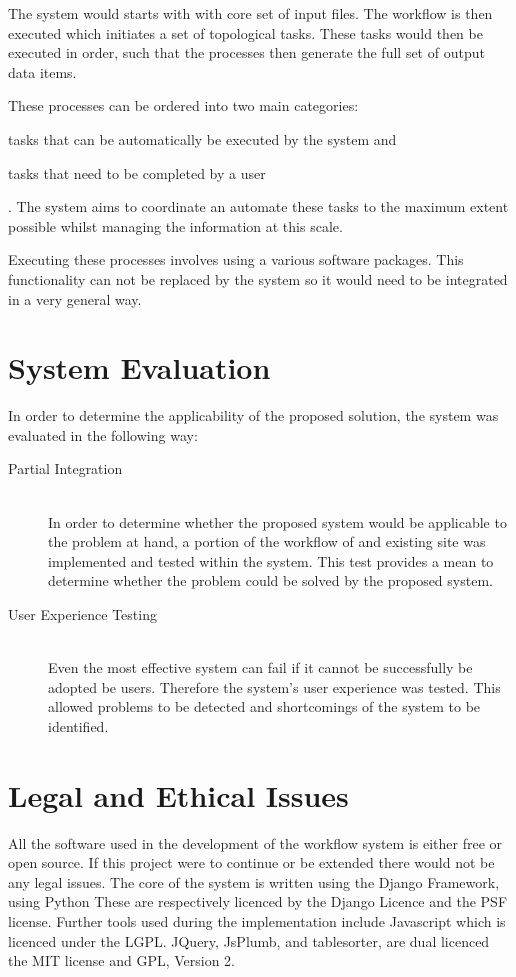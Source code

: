 \documentclass[12pt,a4paper]{report}
\begin{document}
	\noindent The system would starts with with
	core set of input files. The workflow is then executed which initiates a set
	of topological tasks. These tasks would then be executed in order, such that
    the processes then generate the full set of output data items.

    These processes can be ordered into two main categories:
    \begin{inparaenum}[i)]
        \item tasks that can be automatically be executed by the system and
        \item tasks that need to be completed by a user
    \end{inparaenum}. The system aims to coordinate an automate these tasks to
    the maximum extent possible whilst managing the information at this
    scale.

    Executing these processes involves using a various software packages.
    This functionality can not be replaced by the system so it would need
    to be integrated in a very general way.

\section{System Evaluation}
    In order to determine the applicability of the proposed solution, the system
    was evaluated in the following way:

    \begin{description}
        \item[Partial Integration]\hfill \\
            In order to determine whether the proposed system
            would be applicable to the problem at hand, a portion of the workflow
            of and existing site was implemented and tested within the system. This
            test provides a mean to determine whether the problem could be solved
            by the proposed system.
        \item[User Experience Testing] \hfill \\
            Even the most effective system can fail if it cannot
            be successfully be adopted be users. Therefore the system's
            user experience was tested. This allowed problems to be detected and
            shortcomings of the system to be identified\cite{tullis2008measuring}.
    \end{description}

\section{Legal and Ethical Issues}
    All the software used in the development of the workflow system
    is either free or open source. If this project were to continue
    or be extended there would not be any legal issues. The core
    of the system is written using the Django Framework, using Python
    These are respectively licenced by the Django Licence and the PSF
    license. Further tools used during the implementation include Javascript
    which is licenced under the LGPL.
    JQuery, JsPlumb, and tablesorter, are dual licenced the  MIT license 
    and GPL, Version 2.
\end{document}
